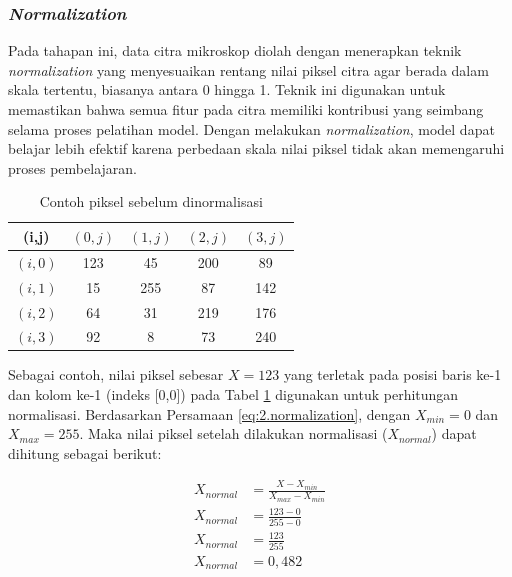 \subsubsection{\textit{Normalization}}
Pada tahapan ini, data citra mikroskop diolah dengan menerapkan teknik \textit{normalization} yang menyesuaikan rentang nilai piksel citra agar berada dalam skala tertentu, biasanya antara 0 hingga 1. Teknik ini digunakan untuk memastikan bahwa semua fitur pada citra memiliki kontribusi yang seimbang selama proses pelatihan model. Dengan melakukan \textit{normalization}, model dapat belajar lebih efektif karena perbedaan skala nilai piksel tidak akan memengaruhi proses pembelajaran.  \par

\begin{table}[h!]
\centering
\caption{Contoh piksel sebelum dinormalisasi}
\renewcommand{\arraystretch}{1.2} %
\setlength{\tabcolsep}{10pt} %
\label{table:3.contoh-normalization}
\begin{tabular}{|c|c|c|c|c|}
\hline
\textbf{(i,j)} & \textbf{$(0,j)$} & \textbf{$(1,j)$} & \textbf{$(2,j)$} & \textbf{$(3,j)$} \\ \hline
$(i,0)$ & 123 & 45 & 200 & 89 \\ \hline
$(i,1)$ & 15  & 255 & 87 & 142 \\ \hline
$(i,2)$ & 64  & 31 & 219 & 176 \\ \hline
$(i,3)$ & 92  & 8 & 73 & 240 \\ \hline
\end{tabular}
\end{table}

Sebagai contoh, nilai piksel sebesar $X = 123$ yang terletak pada posisi baris ke-1 dan kolom ke-1 (indeks [0,0]) pada Tabel \ref{table:3.contoh-normalization} digunakan untuk perhitungan normalisasi. Berdasarkan Persamaan \ref{eq:2.normalization}, dengan $X_{min} = 0$ dan $X_{max} = 255$. Maka nilai piksel setelah dilakukan normalisasi ($X_{normal}$) dapat dihitung sebagai berikut: 

\begin{align*}
    X_{normal} &= \frac{X - X_{min}}{X_{max} - X_{min}} \\[0.5em]
    X_{normal} &= \frac{123 - 0}{255 - 0} \\[0.5em]
    X_{normal} &= \frac{123}{255} \\[0.5em]
    X_{normal} &= 0{,}482 \\[0.5em]
\end{align*}

